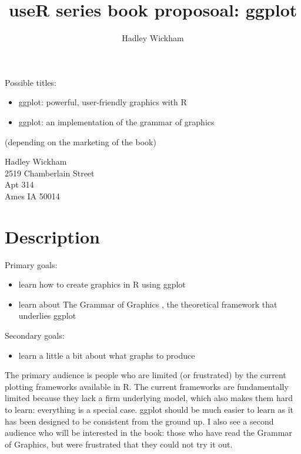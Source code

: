\documentclass[oneside,letterpaper]{scrartcl}
\title{useR series book proposoal: ggplot}
\author{Hadley Wickham}
\begin{document}
\maketitle

Possible titles:

\begin{itemize}
  \item ggplot: powerful, user-friendly graphics with R
  \item ggplot: an implementation of the grammar of graphics
\end{itemize}

(depending on the marketing of the book)

Hadley Wickham \\
2519 Chamberlain Street \\
Apt 314 \\
Ames IA 50014 \\

\section{Description}\label{sec:description}


Primary goals:

\begin{itemize}
  \item learn how to create graphics in R using ggplot
  \item learn about The Grammar of Graphics \citep{wilkinson:2006}, the theoretical framework that underlies ggplot
\end{itemize}

\noindent Secondary goals:

\begin{itemize}
  \item learn a little a bit about what graphs to produce
\end{itemize}

The primary audience is people who are limited (or frustrated) by the current plotting frameworks available in R.  The current frameworks are fundamentally limited because they lack a firm underlying model, which also makes them hard to learn: everything is a special case.  ggplot should be much easier to learn as it has been designed to be consistent from the ground up.  I also see a second audience who will be interested in the book: those who have read the Grammar of Graphics, but were frustrated that they could not try it out.  
\end{document}
